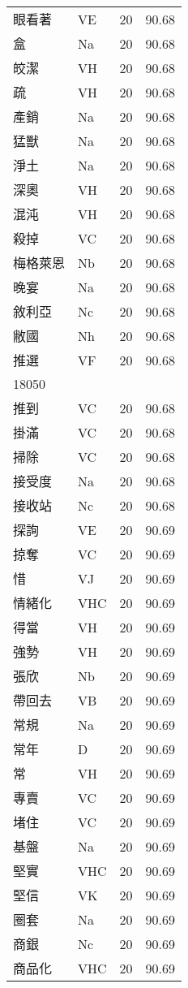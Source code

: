 \documentclass[twocolumn]{book}
\begin{document}
\begin{supertabular}{llrr}
眼看著 & VE & 20 &  90.68\\
盒 & Na & 20 &  90.68\\
皎潔 & VH & 20 &  90.68\\
疏 & VH & 20 &  90.68\\
產銷 & Na & 20 &  90.68\\
猛獸 & Na & 20 &  90.68\\
淨土 & Na & 20 &  90.68\\
深奧 & VH & 20 &  90.68\\
混沌 & VH & 20 &  90.68\\
殺掉 & VC & 20 &  90.68\\
梅格萊恩 & Nb & 20 &  90.68\\
晚宴 & Na & 20 &  90.68\\
敘利亞 & Nc & 20 &  90.68\\
敝國 & Nh & 20 &  90.68\\
推選 & VF & 20 &  90.68\\
18050\\
推到 & VC & 20 &  90.68\\
掛滿 & VC & 20 &  90.68\\
掃除 & VC & 20 &  90.68\\
接受度 & Na & 20 &  90.68\\
接收站 & Nc & 20 &  90.68\\
探詢 & VE & 20 &  90.69\\
掠奪 & VC & 20 &  90.69\\
惜 & VJ & 20 &  90.69\\
情緒化 & VHC & 20 &  90.69\\
得當 & VH & 20 &  90.69\\
強勢 & VH & 20 &  90.69\\
張欣 & Nb & 20 &  90.69\\
帶回去 & VB & 20 &  90.69\\
常規 & Na & 20 &  90.69\\
常年 & D & 20 &  90.69\\
常 & VH & 20 &  90.69\\
專賣 & VC & 20 &  90.69\\
堵住 & VC & 20 &  90.69\\
基盤 & Na & 20 &  90.69\\
堅實 & VHC & 20 &  90.69\\
堅信 & VK & 20 &  90.69\\
圈套 & Na & 20 &  90.69\\
商銀 & Nc & 20 &  90.69\\
商品化 & VHC & 20 &  90.69\\

\end{supertabular}
\end{document}
